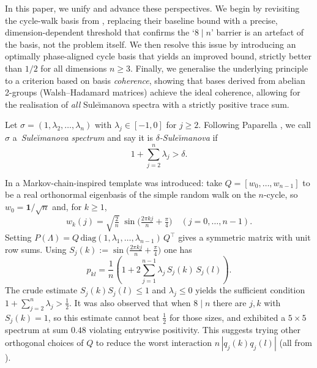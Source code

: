 \documentclass[12pt,fleqn]{amsart}
\renewcommand{\le}{\leqslant}
\renewcommand{\ge}{\geqslant}
\theoremstyle{remark}
\newcommand{\1}{\mathbf{1}}
\newcommand{\Lam}{\Lambda}
\begin{document}
In this paper, we unify and advance these perspectives. We begin by revisiting the cycle-walk basis from \cite{GK20}, replacing their baseline bound with a precise, dimension-dependent threshold that confirms the `$8 \mid n$' barrier is an artefact of the basis, not the problem itself. We then resolve this issue by introducing an optimally phase-aligned cycle basis that yields an improved bound, strictly better than $1/2$ for all dimensions $n \ge 3$. Finally, we generalise the underlying principle to a criterion based on basis \emph{coherence}, showing that bases derived from abelian 2-groups (Walsh--Hadamard matrices) achieve the ideal coherence, allowing for the realisation of \emph{all} Sule\u{\i}manova spectra with a strictly positive trace sum.\smallskip

Let $\sigma=(1,\lambda_2,\ldots,\lambda_n)$ with $\lambda_j\in[-1,0]$ for $j\ge 2$. Following Paparella \cite{Paparella16}, we call $\sigma$ a~\emph{Sule\u{\i}manova spectrum} and say it is \emph{$\delta$-Sule\u{\i}manova} if
\[
1+\sum_{j=2}^n\lambda_j>\delta .
\]

In \cite{GK20} a Markov-chain-inspired template was introduced: take $Q=[w_0,\ldots,w_{n-1}]$ to be a real orthonormal eigenbasis of the simple random walk on the $n$-cycle, so $w_0=\1/\sqrt n$ and, for $k\ge 1$,
\[
w_k(j)=\sqrt{\tfrac{2}{n}}\;\sin\!\Big(\tfrac{2\pi kj}{n}+\tfrac{\pi}{4}\Big)\quad (j=0,\ldots,n-1).
\]
Setting $P(\Lam)=Q\,\mathrm{diag}(1,\lambda_1,\ldots,\lambda_{n-1})\,Q^\top$ gives a symmetric matrix with unit row sums. Using $S_j(k):=\sin\!\big(\tfrac{2\pi kj}{n}+\tfrac{\pi}{4}\big)$ one has
\[
p_{kl}=\frac1n\!\left(1+2\sum_{j=1}^{n-1}\lambda_j\,S_j(k)\,S_j(l)\right).
\]
The crude estimate $S_j(k)S_j(l)\le 1$ and $\lambda_j\le 0$ yields the sufficient condition $1+\sum_{j=2}^n\lambda_j>\tfrac12$. It was also observed that when $8\mid n$ there are $j,k$ with $S_j(k)=1$, so this estimate cannot beat $\tfrac12$ for those sizes, and exhibited a $5\times 5$ spectrum at sum $0.48$ violating entrywise positivity. This suggests  trying other orthogonal choices of $Q$ to reduce the worst interaction $n\,|q_j(k)q_j(l)|$ (all from \cite{GK20}).
\end{document}
